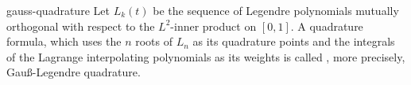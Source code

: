 \begin{Definition}{gauss-quadrature}
  Let $L_k(t)$ be the sequence of Legendre polynomials mutually
  orthogonal with respect to the $L^2$-inner product on $[0,1]$. A
  quadrature formula, which uses the $n$ roots of $L_n$ as its
  quadrature points and the integrals of the Lagrange interpolating
  polynomials as its weights is called , more
  precisely, Gauß-Legendre quadrature.
\end{Definition}
